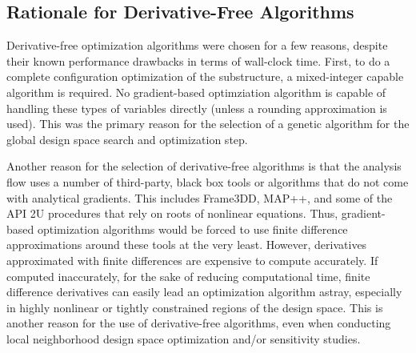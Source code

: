\subsection{Rationale for Derivative-Free Algorithms}
Derivative-free optimization algorithms were chosen for a few reasons,
despite their known performance drawbacks in terms of wall-clock time.
First, to do a complete configuration optimization of the substructure,
a mixed-integer capable algorithm is required.  No gradient-based
optimziation algorithm is capable of handling these types of variables
directly (unless a rounding approximation is used).  This was the
primary reason for the selection of a genetic algorithm for the global
design space search and optimization step.

Another reason for the selection of derivative-free algorithms is that
the analysis flow uses a number of third-party, black box tools or
algorithms that do not come with analytical gradients.  This includes
Frame3DD, MAP++, and some of the API 2U procedures that rely on roots of
nonlinear equations.  Thus, gradient-based optimization algorithms would
be forced to use finite difference approximations around these tools at
the very least.  However, derivatives approximated with finite
differences are expensive to compute accurately.  If computed
inaccurately, for the sake of reducing computational time, finite
difference derivatives can easily lead an optimization algorithm astray,
especially in highly nonlinear or tightly constrained regions of the
design space.  This is another reason for the use of
derivative-free algorithms, even when conducting local neighborhood
design space optimization and/or sensitivity studies.

